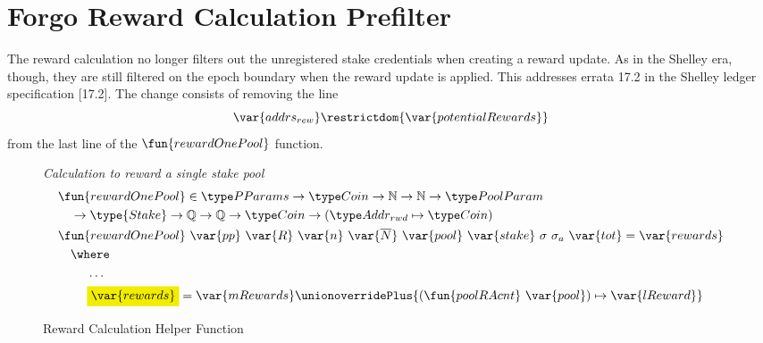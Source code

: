 \newcommand{\Stake}{\type{Stake}}

\section{Forgo Reward Calculation Prefilter}

The reward calculation no longer filters out the unregistered stake
credentials when creating a reward update. As in the Shelley era, though,
they are still filtered on the epoch boundary when the reward update is applied.
This addresses errata 17.2 in the Shelley ledger specification \cite{shelley_spec}[17.2].
The change consists of removing the line
$$\var{addrs_{rew}}\restrictdom{\var{potentialRewards}}$$
from the last line of the $\fun{rewardOnePool}$ function.

\begin{figure}[htb]
  \emph{Calculation to reward a single stake pool}
  \begin{align*}
    & \fun{rewardOnePool} \in \PParams \to \Coin \to \N \to \N \to \PoolParam\\
    & ~~~\to \Stake \to \Q \to \Q \to \Coin \to (\AddrRWD \mapsto \Coin) \\
     & \fun{rewardOnePool}~\var{pp}~\var{R}~\var{n}~\var{\overline{N}}~\var{pool}~\var{stake}~{\sigma}~{\sigma_a}~\var{tot} =
         \var{rewards}\\
     & ~~~\where \\
          & ~~~~~~~\ldots \\
          & ~~~~~~~\hldiff{\var{rewards}} =
               \var{mRewards} \unionoverridePlus
               \{(\fun{poolRAcnt}~\var{pool})\mapsto\var{lReward}\} \\
  \end{align*}
  \caption{Reward Calculation Helper Function}
  \label{fig:functions:reward-calc}
\end{figure}
